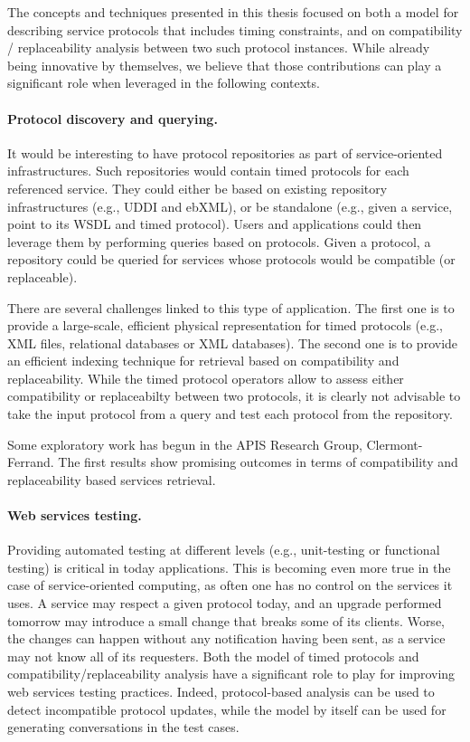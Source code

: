 
The concepts and techniques presented in this thesis focused on both a model for describing service protocols that includes timing constraints, and on compatibility / replaceability analysis between two such protocol instances. While already being innovative by themselves, we believe that those contributions can play a significant role when leveraged in the following contexts.

\paragraph{Protocol discovery and querying.}
It would be interesting to have protocol repositories as part of service-oriented infrastructures. Such repositories would contain timed protocols for each referenced service. They could either be based on existing repository infrastructures (e.g., UDDI and ebXML), or be standalone (e.g., given a service, point to its WSDL and timed protocol). Users and applications could then leverage them by performing queries based on protocols. Given a protocol, a repository could be queried for services whose protocols would be compatible (or replaceable).

There are several challenges linked to this type of application. The first one is to provide a large-scale, efficient physical representation for timed protocols (e.g., XML files, relational databases or XML databases). The second one is to provide an efficient indexing technique for retrieval based on compatibility and replaceability. While the timed protocol operators allow to assess either compatibility or replaceabilty between two protocols, it is clearly not advisable to take the input protocol from a query and test each protocol from the repository.

Some exploratory work has begun in the APIS Research Group, Clermont-Ferrand. The first results show promising outcomes in terms of compatibility and replaceability based services retrieval.

\paragraph{Web services testing.}
Providing automated testing at different levels (e.g., unit-testing or functional testing) is critical in today applications. This is becoming even more true in the case of service-oriented computing, as often one has no control on the services it uses. A service may respect a given protocol today, and an upgrade performed tomorrow may introduce a small change that breaks some of its clients. Worse, the changes can happen without any notification having been sent, as a service may not know all of its requesters. Both the model of timed protocols and compatibility/replaceability analysis have a significant role to play for improving web services testing practices. Indeed, protocol-based analysis can be used to detect incompatible protocol updates, while the model by itself can be used for generating conversations in the test cases.


